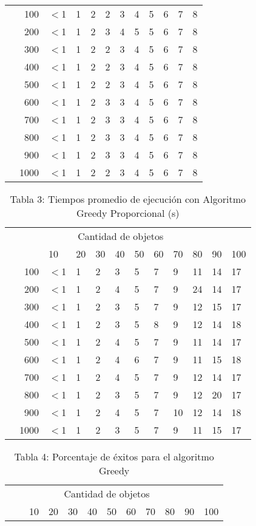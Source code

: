 \documentclass{article}
\begin{document}
\begin{center}
\begin{table}[ht]
\begin{tabularx}{0.8\textwidth}{Xr|XXXXXXXXXX}
\parbox[t]{2mm}{}&100&$<$1&1&2&2&3&4&5&6&7&8\\
&200&$<$1&1&2&3&4&5&5&6&7&8\\
&300&$<$1&1&2&2&3&4&5&6&7&8\\
&400&$<$1&1&2&2&3&4&5&6&7&8\\
&500&$<$1&1&2&2&3&4&5&6&7&8\\
&600&$<$1&1&2&3&3&4&5&6&7&8\\
&700&$<$1&1&2&3&3&4&5&6&7&8\\
&800&$<$1&1&2&3&3&4&5&6&7&8\\
&900&$<$1&1&2&3&3&4&5&6&7&8\\
&1000&$<$1&1&2&2&3&4&5&6&7&8\\
\end{tabularx}
\end{table}
\begin{table}[ht]
\centering
\caption*{Tabla 3: Tiempos promedio de ejecución con Algoritmo Greedy Proporcional (\textmu s)}
\label{3}
\begin{tabularx}{0.8\textwidth}{Xr|XXXXXXXXXX}
&\multicolumn{10}{c}{Cantidad de objetos} \\
&&10&20&30&40&50&60&70&80&90&100\\\hline
\parbox[t]{2mm}{}&100&$<$1&1&2&3&5&7&9&11&14&17\\
&200&$<$1&1&2&4&5&7&9&24&14&17\\
&300&$<$1&1&2&3&5&7&9&12&15&17\\
&400&$<$1&1&2&3&5&8&9&12&14&18\\
&500&$<$1&1&2&4&5&7&9&11&14&17\\
&600&$<$1&1&2&4&6&7&9&11&15&18\\
&700&$<$1&1&2&4&5&7&9&12&14&17\\
&800&$<$1&1&2&3&5&7&9&12&20&17\\
&900&$<$1&1&2&4&5&7&10&12&14&18\\
&1000&$<$1&1&2&3&5&7&9&11&15&17\\
\end{tabularx}
\end{table}
\begin{table}[ht]
\centering
\caption*{Tabla 4: Porcentaje de éxitos para el algoritmo Greedy}
\label{4}
\begin{tabularx}{0.8\textwidth}{Xr|XXXXXXXXXX}
&\multicolumn{10}{c}{Cantidad de objetos} \\
&&10&20&30&40&50&60&70&80&90&100\\\hline

\end{tabularx}
\end{table}
\end{center}
\end{document}
